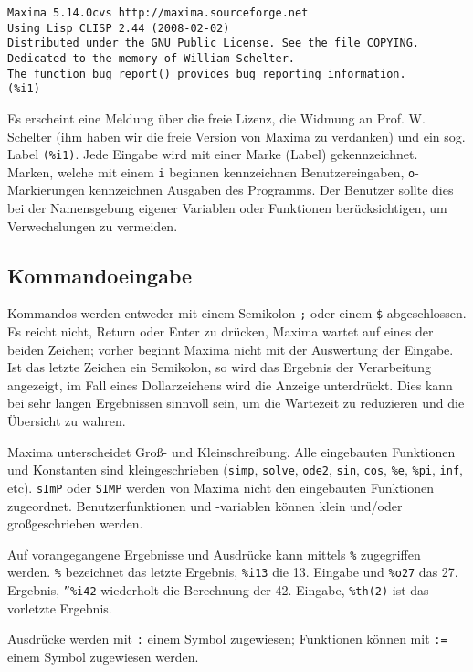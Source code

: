 \documentclass[12pt]{scrartcl}
\begin{document}
\begin{verbatim}
Maxima 5.14.0cvs http://maxima.sourceforge.net
Using Lisp CLISP 2.44 (2008-02-02)
Distributed under the GNU Public License. See the file COPYING.
Dedicated to the memory of William Schelter.
The function bug_report() provides bug reporting information.
(%i1)
\end{verbatim}

Es erscheint eine Meldung über die freie Lizenz, die
Widmung an Prof. W. Schelter (ihm haben wir die freie Version
von Maxima zu verdanken) und ein sog. Label \texttt{(\%i1)}. Jede Eingabe
wird mit einer Marke (Label) gekennzeichnet. Marken, welche mit einem
\texttt{i} beginnen kennzeichnen Benutzereingaben, \texttt{o}-Markierungen kennzeichnen
Ausgaben des Programms. Der Benutzer sollte dies bei der Namensgebung
eigener  Variablen oder Funktionen berücksichtigen, um Verwechslungen
zu vermeiden.

\subsection{Kommandoeingabe}

Kommandos werden entweder mit einem Semikolon  \texttt{;}  oder einem
\texttt{\$} abgeschlossen.  Es reicht nicht, Return oder Enter zu
drücken, Maxima wartet auf eines der beiden Zeichen; vorher beginnt
Maxima nicht mit der Auswertung der Eingabe. Ist das letzte Zeichen
ein Semikolon, so wird das Ergebnis der Verarbeitung angezeigt, im
Fall eines Dollarzeichens wird die Anzeige unterdrückt. Dies kann bei
sehr langen Ergebnissen sinnvoll sein, um die Wartezeit zu reduzieren
und die Übersicht zu wahren.

Maxima unterscheidet Groß- und Kleinschreibung. Alle eingebauten
Funktionen und Konstanten sind kleingeschrieben (\texttt{simp},
\texttt{solve}, \texttt{ode2}, \texttt{sin}, \texttt{cos},
\texttt{\%e}, \texttt{\%pi}, \texttt{inf}, etc). \texttt{sImP} oder
\texttt{SIMP} werden von Maxima nicht den eingebauten Funktionen
zugeordnet. Benutzerfunktionen und -variablen können klein und/oder
großgeschrieben  werden.

Auf vorangegangene Ergebnisse und Ausdrücke kann mittels \texttt{\%}
zugegriffen werden. \texttt{\%} bezeichnet das letzte Ergebnis,
\texttt{\%i13} die 13. Eingabe und \texttt{\%o27} das 27. Ergebnis,
\texttt{''\%i42} wiederholt die Berechnung der 42. Eingabe,
\texttt{\%th(2)} ist das vorletzte Ergebnis.

Ausdrücke werden mit \texttt{:} einem Symbol zugewiesen; Funktionen
können mit \texttt{:=} einem Symbol zugewiesen werden.
\end{document}
